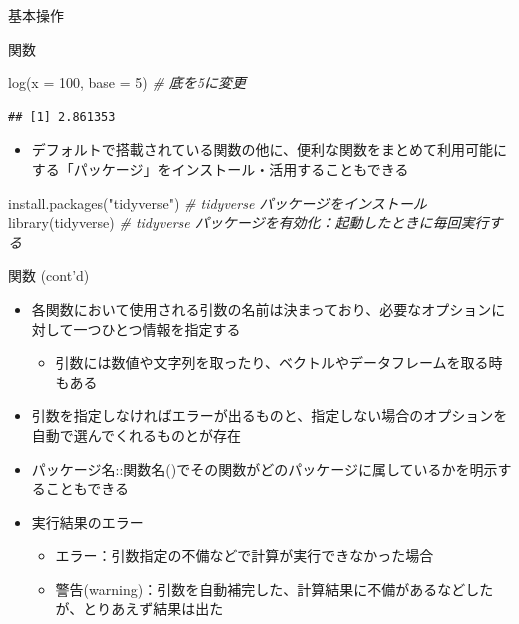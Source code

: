 \documentclass[
  ignorenonframetext,
]{beamer}
\newenvironment{Shaded}{\begin{snugshade}}{\end{snugshade}}
\newcommand{\AttributeTok}[1]{\textcolor[rgb]{0.77,0.63,0.00}{#1}}
\newcommand{\CommentTok}[1]{\textcolor[rgb]{0.56,0.35,0.01}{\textit{#1}}}
\newcommand{\DecValTok}[1]{\textcolor[rgb]{0.00,0.00,0.81}{#1}}
\newcommand{\FunctionTok}[1]{\textcolor[rgb]{0.00,0.00,0.00}{#1}}
\newcommand{\NormalTok}[1]{#1}
\newcommand{\StringTok}[1]{\textcolor[rgb]{0.31,0.60,0.02}{#1}}
\providecommand{\tightlist}{%
  \setlength{\itemsep}{0pt}\setlength{\parskip}{0pt}}
\begin{document}
\begin{frame}[fragile]{基本操作}
\begin{block}{関数}
\begin{Shaded}
\begin{Highlighting}[]
\FunctionTok{log}\NormalTok{(}\AttributeTok{x =} \DecValTok{100}\NormalTok{, }\AttributeTok{base =} \DecValTok{5}\NormalTok{) }\CommentTok{\# 底を5に変更}
\end{Highlighting}
\end{Shaded}

\begin{verbatim}
## [1] 2.861353
\end{verbatim}

\begin{itemize}
\tightlist
\item
  デフォルトで搭載されている関数の他に、便利な関数をまとめて利用可能にする「パッケージ」をインストール・活用することもできる
\end{itemize}

\begin{Shaded}
\begin{Highlighting}[]
\FunctionTok{install.packages}\NormalTok{(}\StringTok{"tidyverse"}\NormalTok{) }\CommentTok{\# tidyverse パッケージをインストール}
\FunctionTok{library}\NormalTok{(tidyverse) }\CommentTok{\# tidyverse パッケージを有効化：起動したときに毎回実行する}
\end{Highlighting}
\end{Shaded}
\end{block}

\begin{block}{関数 (cont'd)}
\protect\hypertarget{ux95a2ux6570-contd}{}
\begin{itemize}
\tightlist
\item
  各関数において使用される引数の名前は決まっており、必要なオプションに対して一つひとつ情報を指定する

  \begin{itemize}
  \tightlist
  \item
    引数には数値や文字列を取ったり、ベクトルやデータフレームを取る時もある
  \end{itemize}
\item
  引数を指定しなければエラーが出るものと、指定しない場合のオプションを自動で選んでくれるものとが存在
\item
  パッケージ名::関数名()でその関数がどのパッケージに属しているかを明示することもできる
\item
  実行結果のエラー

  \begin{itemize}
  \tightlist
  \item
    エラー：引数指定の不備などで計算が実行できなかった場合
  \item
    警告(warning)：引数を自動補完した、計算結果に不備があるなどしたが、とりあえず結果は出た
  \end{itemize}
\end{itemize}
\end{block}


\end{frame}
\end{document}
